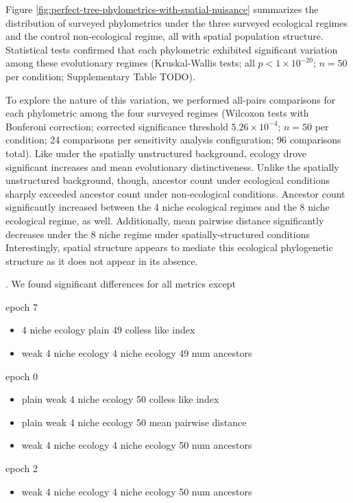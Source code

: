 Figure \ref{fig:perfect-tree-phylometrics-with-spatial-nuisance} summarizes the distribution of surveyed phylometrics under the three surveyed ecological regimes and the control non-ecological regime, all with spatial population structure.
Statistical tests confirmed that each phylometric exhibited significant  variation among these evolutionary regimes (Kruskal-Wallis tests; all $p < 1\times10^{-20}$; $n=50$ per condition; Supplementary Table TODO).

To explore the nature of this variation, we performed all-pairs comparisons for each phylometric among the four surveyed regimes (Wilcoxon tests with Bonferoni correction; corrected significance threshold $5.26 \times 10^{-4}$; $n=50$ per condition; 24 comparisons per sensitivity analysis configuration; 96 comparisons total).
Like under the spatially unstructured background, ecology drove significant increases and mean evolutionary distinctiveness. 
Unlike the spatially unstructured background, though, ancestor count under ecological conditions sharply exceeded ancestor count under non-ecological conditions.
Ancestor count significantly increased between the 4 niche ecological regimes and the 8 niche ecological regime, as well.
Additionally, mean pairwise distance significantly decreases  under the 8 niche regime under spatially-structured conditions 
Interestingly, spatial structure appears to mediate this ecological phylogenetic structure as it does not appear in its absence.



. We found significant differences for all metrics except

epoch 7
\begin{itemize}
    \item 4 niche ecology	plain	49	colless like index
\item weak 4 niche ecology	4 niche ecology	49	num ancestors
\end{itemize}

epoch 0
\begin{itemize}

\item plain	weak 4 niche ecology	50	colless like index
\item plain	weak 4 niche ecology	50	mean pairwise distance
\item weak 4 niche ecology	4 niche ecology	50	num ancestors

\end{itemize}

epoch 2
\begin{itemize}
    \item weak 4 niche ecology	4 niche ecology	50	num ancestors
\end{itemize}

